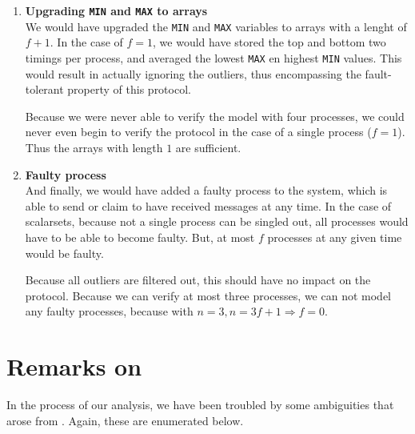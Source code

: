 \documentclass[a4paper,10pt]{article}
\begin{document}
\begin{enumerate}
\item \textbf{Upgrading \texttt{MIN} and \texttt{MAX} to arrays} \\
	We would have upgraded the \texttt{MIN} and \texttt{MAX} variables to arrays with a lenght of $f+1$. In the case of $f=1$, we would have stored the top and bottom two timings per process, and averaged the lowest \texttt{MAX} en highest \texttt{MIN} values. This would result in actually ignoring the outliers, thus encompassing the fault-tolerant property of this protocol.
	
	Because we were never able to verify the model with four processes, we could never even begin to verify the protocol in the case of a single process ($f=1$). Thus the arrays with length $1$ are sufficient.
	
\item \textbf{Faulty process} \\
	And finally, we would have added a faulty process to the system, which is able to send or claim to have received messages at any time. In the case of scalarsets, because not a single process can be singled out, all processes would have to be able to become faulty. But, at most $f$ processes at any given time would be faulty.
	
	Because all outliers are filtered out, this should have no impact on the protocol. Because we can verify at most three processes, we can not model any faulty processes, because with $n = 3, n = 3f+1 \Rightarrow f=0$.
	
\end{enumerate}

\section{Remarks on \cite{Aceto2004Notes}\label{sec:remarks}}

In the process of our analysis, we have been troubled by some ambiguities that arose from \cite{Aceto2004Notes}. Again, these are enumerated below.
\end{document}

